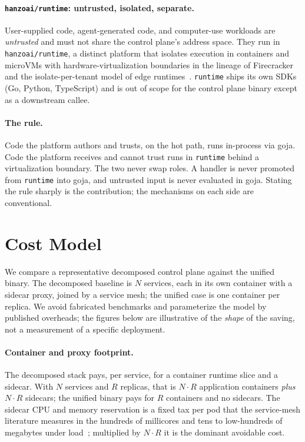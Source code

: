 \documentclass[11pt]{article}
\begin{document}
\paragraph{\texttt{hanzoai/runtime}: untrusted, isolated, separate.}
User-supplied code, agent-generated code, and computer-use workloads are
\emph{untrusted} and must not share the control plane's address space. They
run in \texttt{hanzoai/runtime}, a distinct platform that isolates
execution in containers and microVMs with hardware-virtualization
boundaries in the lineage of Firecracker~\cite{firecracker} and the
isolate-per-tenant model of edge
runtimes~\cite{cloudflareworkers,wasm_serverless}. \texttt{runtime} ships
its own SDKs (Go, Python, TypeScript) and is out of scope for the control
plane binary except as a downstream callee.

\paragraph{The rule.}
Code the platform authors and trusts, on the hot path, runs in-process via
goja. Code the platform receives and cannot trust runs in \texttt{runtime}
behind a virtualization boundary. The two never swap roles. A handler is
never promoted from \texttt{runtime} into goja, and untrusted input is
never evaluated in goja. Stating the rule sharply is the contribution; the
mechanisms on each side are conventional.

\section{Cost Model}
\label{sec:cost}

We compare a representative decomposed control plane against the unified
binary. The decomposed baseline is $N$ services, each in its own container
with a sidecar proxy, joined by a service mesh; the unified case is one
container per replica. We avoid fabricated benchmarks and parameterize the
model by published overheads; the figures below are illustrative of the
\emph{shape} of the saving, not a measurement of a specific deployment.



\paragraph{Container and proxy footprint.}
The decomposed stack pays, per service, for a container runtime slice and a
sidecar. With $N$ services and $R$ replicas, that is $N\cdot R$ application
containers \emph{plus} $N\cdot R$ sidecars; the unified binary pays for
$R$ containers and no sidecars. The sidecar CPU and memory reservation is
a fixed tax per pod that the service-mesh literature measures in the
hundreds of millicores and tens to low-hundreds of megabytes under
load~\cite{istio_overhead}; multiplied by $N\cdot R$ it is the dominant
avoidable cost.
\end{document}
